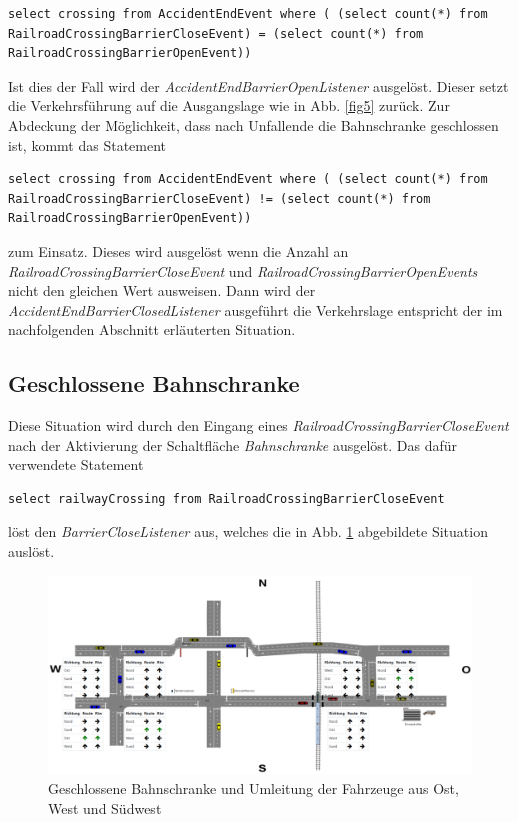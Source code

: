\begin{lstlisting}
select crossing from AccidentEndEvent where ( (select count(*) from RailroadCrossingBarrierCloseEvent) = (select count(*) from RailroadCrossingBarrierOpenEvent))
\end{lstlisting}

Ist dies der Fall wird der \textit{AccidentEndBarrierOpenListener} ausgelöst. Dieser setzt die Verkehrsführung auf die Ausgangslage wie in Abb. \ref{fig5} zurück. Zur Abdeckung der Möglichkeit, dass nach Unfallende die Bahnschranke geschlossen ist, kommt das Statement

\begin{lstlisting}
select crossing from AccidentEndEvent where ( (select count(*) from RailroadCrossingBarrierCloseEvent) != (select count(*) from RailroadCrossingBarrierOpenEvent))
\end{lstlisting}

zum Einsatz. Dieses wird ausgelöst wenn die Anzahl an \textit{RailroadCrossingBarrierCloseEvent} und \textit{RailroadCrossingBarrierOpenEvents} nicht den gleichen Wert ausweisen. Dann wird der \textit{AccidentEndBarrierClosedListener} ausgeführt die Verkehrslage entspricht der im nachfolgenden Abschnitt erläuterten Situation.

\subsection{Geschlossene Bahnschranke} \label{closedBarrier}

Diese Situation wird durch den Eingang eines \textit{RailroadCrossingBarrierCloseEvent} nach der Aktivierung der Schaltfläche \textit{Bahnschranke} ausgelöst. Das dafür verwendete Statement

\begin{lstlisting}
select railwayCrossing from RailroadCrossingBarrierCloseEvent
\end{lstlisting}

löst den \textit{BarrierCloseListener} aus, welches die in Abb. \ref{fig7} abgebildete Situation auslöst.

\begin{figure}[ht]
	\includegraphics[width=\textwidth]{images/RailroadBarrierClose.png}
	\caption{Geschlossene Bahnschranke und Umleitung der Fahrzeuge aus Ost, West und Südwest}
	\label{fig7}
\end{figure}

